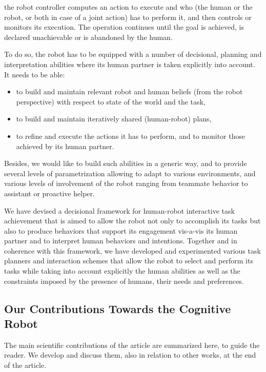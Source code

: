 \documentclass[preprint,5p]{elsarticle}
\begin{document}
the robot controller computes an action to execute and who (the 
human or the robot, or both in case of a joint action) has to perform
it, and then controls or monitors its execution. The operation
continues until the goal is achieved, is declared unachievable or is
abandoned by the human.

To do so, the robot has to be equipped with a number of decisional, planning
and interpretation abilities where its human partner is taken
explicitly into account. It needs to be able:

\begin {itemize}
\item to build and maintain relevant robot and human beliefs
  (from the robot perspective) with respect to state of the world and the task,
\item to build and maintain iteratively shared (human-robot) plans, 
\item to refine and execute the actions it has to perform, and to monitor 
those achieved by its human partner.
\end {itemize}

Besides, we would like to build such abilities in a generic way, and
to provide several levels of parametrization allowing to adapt to
various environments, and various levels of involvement of the robot
ranging from teammate behavior to assistant or proactive helper.

We have devised a decisional framework for human-robot interactive
task achievement that is aimed to allow the robot not only to
accomplish its tasks but also to produce behaviors that support its
engagement vis-a-vis its human partner and to interpret human
behaviors and intentions. 
Together and in coherence with this framework, we have developed
and experimented various task planners and interaction schemes that
allow the robot to select and perform its tasks while taking into
account explicitly the human abilities as well as the constraints
imposed by the presence of humans, their needs and preferences. 



\subsection{Our Contributions Towards the Cognitive Robot}

The main scientific contributions of the article are summarized here, to guide
the reader. We develop and discuss them, also in relation to other works, at
the end of the article.
\end{document}
